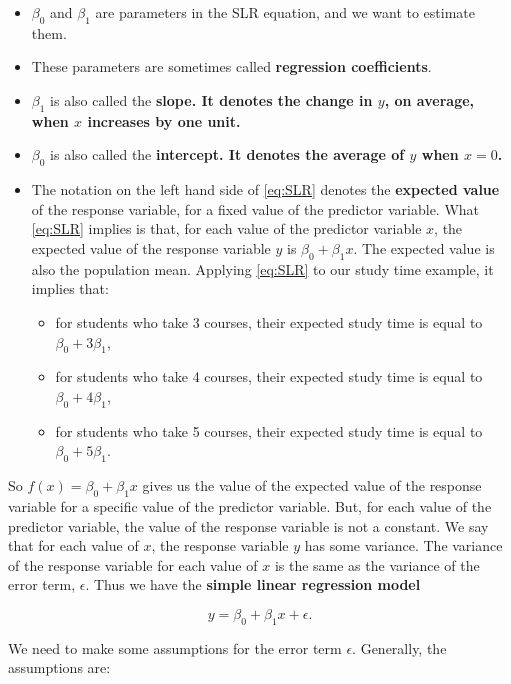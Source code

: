 \documentclass[
]{book}
\providecommand{\tightlist}{%
  \setlength{\itemsep}{0pt}\setlength{\parskip}{0pt}}
\begin{document}
\begin{itemize}
\item
  \(\beta_0\) and \(\beta_1\) are parameters in the SLR equation, and we want to estimate them.
\item
  These parameters are sometimes called \textbf{regression coefficients}.
\item
  \(\beta_1\) is also called the \textbf{slope. It denotes the change in \(y\), on average, when \(x\) increases by one unit.}
\item
  \(\beta_0\) is also called the \textbf{intercept. It denotes the average of \(y\) when \(x=0\).}
\item
  The notation on the left hand side of \eqref{eq:SLR} denotes the \textbf{expected value} of the response variable, for a fixed value of the predictor variable. What \eqref{eq:SLR} implies is that, for each value of the predictor variable \(x\), the expected value of the response variable \(y\) is \(\beta_0+\beta_{1}x\). The expected value is also the population mean. Applying \eqref{eq:SLR} to our study time example, it implies that:

  \begin{itemize}
  \tightlist
  \item
    for students who take 3 courses, their expected study time is equal to \(\beta_0 + 3\beta_1\),
  \item
    for students who take 4 courses, their expected study time is equal to \(\beta_0 + 4\beta_1\),
  \item
    for students who take 5 courses, their expected study time is equal to \(\beta_0 + 5\beta_1\).
  \end{itemize}
\end{itemize}

So \(f(x) = \beta_0 + \beta_1x\) gives us the value of the expected value of the response variable for a specific value of the predictor variable. But, for each value of the predictor variable, the value of the response variable is not a constant. We say that for each value of \(x\), the response variable \(y\) has some variance. The variance of the response variable for each value of \(x\) is the same as the variance of the error term, \(\epsilon\). Thus we have the \textbf{simple linear regression model}

\begin{equation} 
y=\beta_0+\beta_{1} x + \epsilon. 
\label{eq:SLRmod}
\end{equation}

We need to make some assumptions for the error term \(\epsilon\). Generally, the assumptions are:
\end{document}
